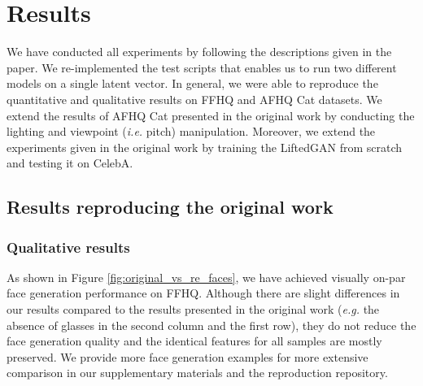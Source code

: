 \section{Results}
\label{sec:results}

We have conducted all experiments by following the descriptions given in the paper. We re-implemented the test scripts that enables us to run two different models on a single latent vector. In general, we were able to reproduce the quantitative and qualitative results on FFHQ and AFHQ Cat datasets. We extend the results of AFHQ Cat presented in the original work by conducting the lighting and viewpoint (\textit{i.e.} pitch) manipulation. Moreover, we extend the experiments given in the original work by training the LiftedGAN from scratch and testing it on CelebA.


\subsection{Results reproducing the original work}
\subsubsection{Qualitative results}

As shown in Figure \ref{fig:original_vs_re_faces}, we have achieved visually on-par face generation performance on FFHQ. Although there are slight differences in our results compared to the results presented in the original work (\textit{e.g.} the absence of glasses in the second column and the first row), they do not reduce the face generation quality and the identical features for all samples are mostly preserved. We provide more face generation examples for more extensive comparison in our supplementary materials and the reproduction repository.

